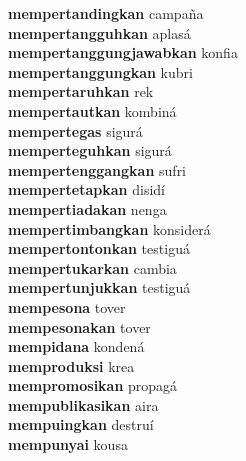\textbf{mempertandingkan } campaña \\
\textbf{mempertangguhkan } aplasá \\
\textbf{mempertanggungjawabkan } konfia \\
\textbf{mempertanggungkan } kubri \\
\textbf{mempertaruhkan } rek \\
\textbf{mempertautkan } kombiná \\
\textbf{mempertegas } sigurá \\
\textbf{memperteguhkan } sigurá \\
\textbf{mempertenggangkan } sufri \\
\textbf{mempertetapkan } disidí \\
\textbf{mempertiadakan } nenga \\
\textbf{mempertimbangkan } konsiderá \\
\textbf{mempertontonkan } testiguá \\
\textbf{mempertukarkan } cambia \\
\textbf{mempertunjukkan } testiguá \\
\textbf{mempesona } tover \\
\textbf{mempesonakan } tover \\
\textbf{mempidana } kondená \\
\textbf{memproduksi } krea \\
\textbf{mempromosikan } propagá \\
\textbf{mempublikasikan } aira \\
\textbf{mempuingkan } destruí \\
\textbf{mempunyai } kousa \\
